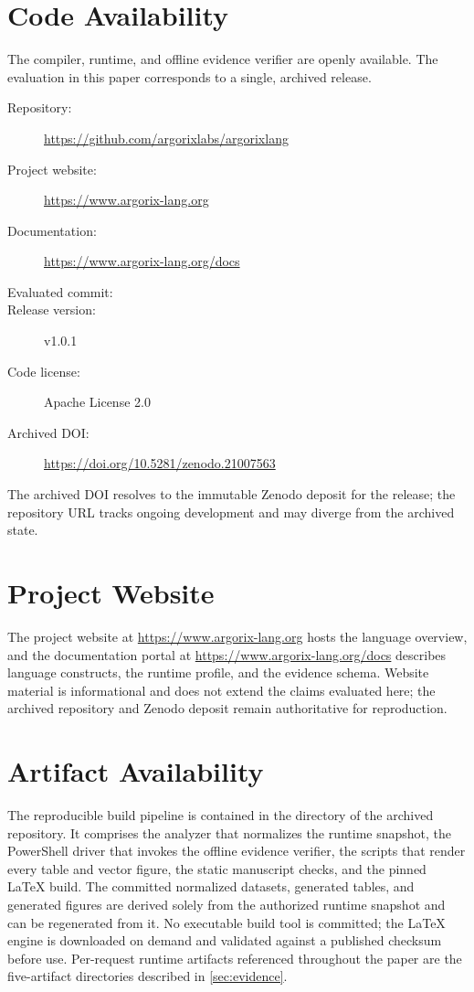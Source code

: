 \section*{Code Availability}\label{sec:code-availability}
The \Argorix compiler, runtime, and offline evidence verifier are openly
available. The evaluation in this paper corresponds to a single, archived
release.

\begin{description}
\item[Repository:] \url{https://github.com/argorixlabs/argorixlang}
\item[Project website:] \url{https://www.argorix-lang.org}
\item[Documentation:] \url{https://www.argorix-lang.org/docs}
\item[Evaluated commit:] 
\item[Release version:] v1.0.1
\item[Code license:] Apache License 2.0
\item[Archived DOI:] \url{https://doi.org/10.5281/zenodo.21007563}
\end{description}

The archived DOI resolves to the immutable Zenodo deposit for the release; the
repository URL tracks ongoing development and may diverge from the archived
state.

\section*{Project Website}\label{sec:project-website}
The project website at \url{https://www.argorix-lang.org} hosts the language
overview, and the documentation portal at
\url{https://www.argorix-lang.org/docs} describes language constructs, the
runtime profile, and the evidence schema. Website material is informational and
does not extend the claims evaluated here; the archived repository and Zenodo
deposit remain authoritative for reproduction.

\section*{Artifact Availability}\label{sec:artifact-availability}
The reproducible build pipeline is contained in the  directory of
the archived repository. It comprises the analyzer that normalizes the runtime
snapshot, the PowerShell driver that invokes the offline evidence verifier, the
scripts that render every table and vector figure, the static manuscript checks,
and the pinned LaTeX build. The committed normalized datasets, generated tables,
and generated figures are derived solely from the authorized runtime snapshot
and can be regenerated from it. No executable build tool is committed; the LaTeX
engine is downloaded on demand and validated against a published checksum before
use. Per-request runtime artifacts referenced throughout the paper are the
five-artifact directories described in \cref{sec:evidence}.

